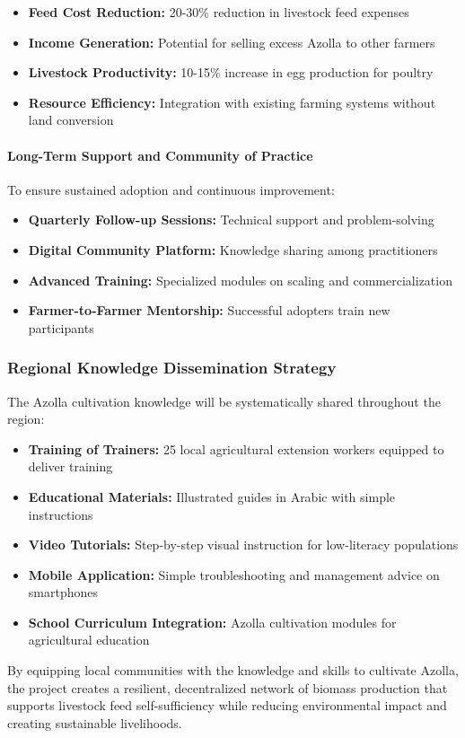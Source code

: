 \begin{itemize}
    \item \textbf{Feed Cost Reduction:} 20-30\% reduction in livestock feed expenses
    \item \textbf{Income Generation:} Potential for selling excess Azolla to other farmers
    \item \textbf{Livestock Productivity:} 10-15\% increase in egg production for poultry
    \item \textbf{Resource Efficiency:} Integration with existing farming systems without land conversion
\end{itemize}

\paragraph{Long-Term Support and Community of Practice}
To ensure sustained adoption and continuous improvement:

\begin{itemize}
    \item \textbf{Quarterly Follow-up Sessions:} Technical support and problem-solving
    \item \textbf{Digital Community Platform:} Knowledge sharing among practitioners
    \item \textbf{Advanced Training:} Specialized modules on scaling and commercialization
    \item \textbf{Farmer-to-Farmer Mentorship:} Successful adopters train new participants
\end{itemize}

\subsubsection{Regional Knowledge Dissemination Strategy}

The Azolla cultivation knowledge will be systematically shared throughout the region:

\begin{itemize}
    \item \textbf{Training of Trainers:} 25 local agricultural extension workers equipped to deliver training
    \item \textbf{Educational Materials:} Illustrated guides in Arabic with simple instructions
    \item \textbf{Video Tutorials:} Step-by-step visual instruction for low-literacy populations
    \item \textbf{Mobile Application:} Simple troubleshooting and management advice on smartphones
    \item \textbf{School Curriculum Integration:} Azolla cultivation modules for agricultural education
\end{itemize}

By equipping local communities with the knowledge and skills to cultivate Azolla, the project creates a resilient, decentralized network of biomass production that supports livestock feed self-sufficiency while reducing environmental impact and creating sustainable livelihoods.
